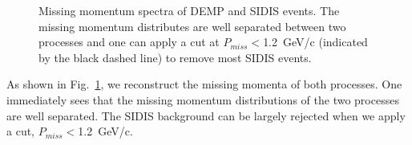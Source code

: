 \begin{figure}[!ht]
 \begin{center}
   \caption[Missing Momentum]{\footnotesize{Missing momentum spectra of DEMP
       and SIDIS events. The missing momentum distributes are well separated
       between two processes and one can apply a cut at $P_{miss}<$1.2~GeV/c
       (indicated by the black dashed line) to remove most SIDIS events.}}
  \label{missing_mom}
  \end{center}
\end{figure}
As shown in Fig.~\ref{missing_mom}, we reconstruct the missing momenta of both
processes. One immediately sees that the missing momentum distributions of the
two processes are well separated. The SIDIS background can be largely rejected
when we apply a cut, $P_{miss}<$1.2~GeV/c.

